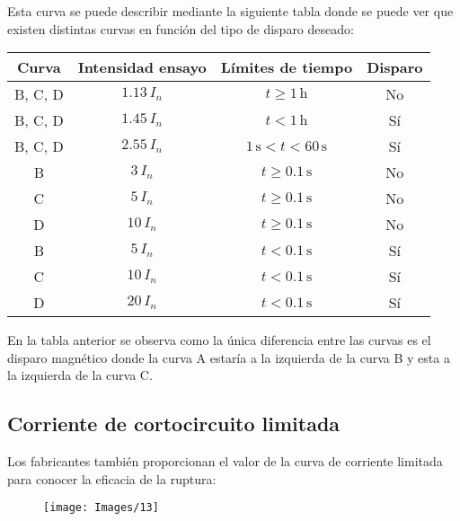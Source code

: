 Esta curva se puede describir mediante la siguiente tabla donde se puede ver que existen distintas curvas en función del tipo de disparo deseado:
\begin{table}[H]
	\centering
	\begin{tabular}{|c|c|c|c|}
		\hline
		\textbf{Curva} & \textbf{Intensidad ensayo} & \textbf{Límites de tiempo} & \textbf{Disparo} \\ \hline
		B, C, D & $1.13 \, I_n$ & $t \geq 1 \, \text{h}$ & No \\ \hline
		B, C, D & $1.45 \, I_n$ & $t < 1 \, \text{h}$ & Sí \\ \hline
		B, C, D & $2.55 \, I_n$ & $1 \, \text{s} < t < 60 \, \text{s}$ & Sí \\ \hline
		\color{red}
		B      &\color{red} $3 \, I_n$    &\color{red} $t \geq 0.1 \, \text{s}$ &\color{red} No \\ \hline
		\color{red}C      & \color{red}$5 \, I_n$    &\color{red} $t \geq 0.1 \, \text{s}$ &\color{red} No \\ \hline
		\color{red} D      &\color{red} $10 \, I_n$   &\color{red} $t \geq 0.1 \, \text{s}$ &\color{red} No \\ \hline
				\color{blue}
		B      &\color{blue} $5 \, I_n$    &\color{blue} $t < 0.1 \, \text{s}$ &\color{blue} Sí \\ \hline
		\color{blue} C      &\color{blue} $10 \, I_n$   &\color{blue} $t < 0.1 \, \text{s}$ &\color{blue} Sí \\ \hline
		\color{blue}D      &\color{blue} $20 \, I_n$   & \color{blue}$t < 0.1 \, \text{s}$ & \color{blue} Sí \\ \hline
	\end{tabular}
\end{table}
				\color{black}

En la tabla anterior se observa como la única diferencia entre las curvas es el disparo magnético donde la curva A estaría a la izquierda de la curva B y esta a la izquierda de la curva C.
\newpage
\subsection{Corriente de cortocircuito limitada}
Los fabricantes también proporcionan el valor de la curva de corriente limitada para conocer la eficacia de la ruptura:
\begin{figure}[H]
	\centering
	\texttt{[image: Images/13]}
	\label{fig:13}
\end{figure}
